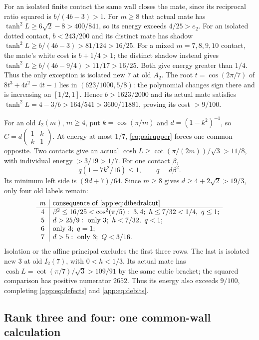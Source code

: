 \documentclass[11pt]{article}
\theoremstyle{definition}
\theoremstyle{remark}
\begin{document}
For an isolated finite contact the same wall closes the mate,
since its reciprocal ratio squared is $b/(4b-3)>1$.
For $m\ge8$ that actual mate has
$\tanh^2L\ge6\sqrt2-8>400/841$, so its energy exceeds
$4/25>e_2$. For an isolated dotted contact,
$b<243/200$ and its distinct mate has shadow
$\tanh^2L\ge b/(4b-3)>81/124>16/25$.
For a mixed $m=7,8,9,10$ contact, the mate's white cost is
$b+1/4>1$; the distinct shadow instead gives
$\tanh^2L\ge b/(4b-9/4)>11/17>16/25$.
Both give energy greater than $1/4$. Thus the only exception is
isolated new $7$ at old $A_2$.
The root $t=\cos(2\pi/7)$ of $8t^3+4t^2-4t-1$ lies in
$(623/1000,5/8)$: the polynomial changes sign there and is increasing
on $[1/2,1]$. Hence $b>1623/2000$ and its actual mate satisfies
$\tanh^2L=4-3/b>164/541>3600/11881$, proving its cost $>9/100$.

For an old $I_2(m)$, $m\ge4$, put $k=\cos(\pi/m)$ and
$d=(1-k^2)^{-1}$, so $C=d\left(\begin{smallmatrix}1&k\\k&1\end{smallmatrix}\right)$.
At energy at most $1/7$, \eqref{eq:pairupper} forces one common
opposite. Two contacts give an actual
$\cosh L\ge\cot(\pi/(2m))/\sqrt3>11/8$, with individual energy
$>3/19>1/7$. For one contact $\beta$,
\begin{equation}\label{app:eq:dihedralcut}
 q(1-7k^2/16)\le1,\qquad q=d\beta^2.
\end{equation}
Its minimum left side is $(9d+7)/64$. Since
$m\ge8$ gives $d\ge4+2\sqrt2>19/3$, only four old labels remain:
\[
\begin{array}{c|l}
m&\text{consequence of \eqref{app:eq:dihedralcut}}\\ \hline
4&\beta^2\le16/25<\cos^2(\pi/5):\ 3,4;\ h\le7/32<1/4,\ q\le1;\\
5&d>25/9:\ \text{only }3;\ h<7/32,\ q<1;\\
6&\text{only }3;\ q=1;\\
7&d>5:\ \text{only }3;\ Q<3/16.
\end{array}
\]
Isolation or the affine principal excludes the first three rows.
The last is isolated new $3$ at old $I_2(7)$, with $0<h<1/3$.
Its actual mate has $\cosh L=\cot(\pi/7)/\sqrt3>109/91$ by the
same cubic bracket; the squared comparison has positive numerator
$2652$. Thus its energy also exceeds $9/100$, completing
\eqref{app:eq:defects} and \eqref{app:eq:debits}.

\subsection{Rank three and four: one common-wall calculation}
\end{document}
